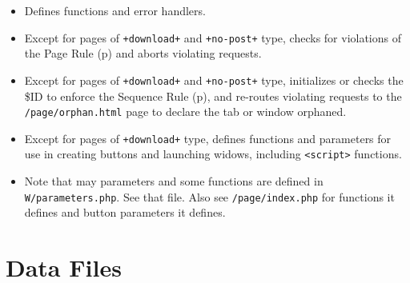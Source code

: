 \documentclass[12pt]{article}
\newcommand{\pagref}[1]{p\pageref{#1}}
\begin{document}
\begin{enumerate}
\begin{itemize}
\item Defines functions and error handlers.

\item Except for pages of {\tt +download+} and {\tt +no-post+} type,
      checks for violations of the Page Rule (\pagref{PAGE-RULE})
      and aborts violating requests.

\item Except for pages of {\tt +download+} and {\tt +no-post+} type,
      initializes or checks the \$ID to enforce the
      Sequence Rule (\pagref{SEQUENCE-RULE}), and
      re-routes violating requests
      to the {\tt /page/orphan.html} page to declare
      the tab or window orphaned.

\item Except for pages of {\tt +download+} type, defines functions
      and parameters for use in creating buttons and launching
      widows, including {\tt <script>} functions.

\item Note that may parameters and some functions are defined in
      {\tt W/parameters.php}.  See that file.  Also see
      {\tt /page/index.php} for functions it defines and button
      parameters it defines.


\end{itemize}


      

\end{enumerate}

\section{Data Files}
\end{document}
